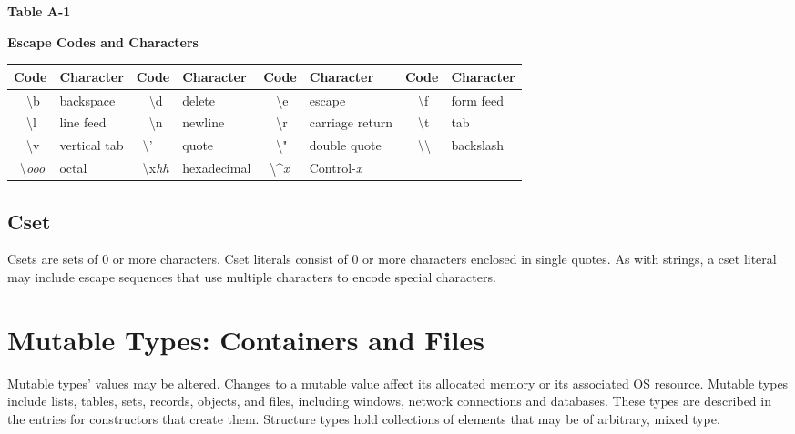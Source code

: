 \begin{center}
{\sffamily\bfseries Table A-1}

{\sffamily\bfseries Escape Codes and Characters}
\end{center}

\begin{center}
\begin{supertabular}{|m{0.38in}|m{0.8in}|m{0.4in}|m{0.855in}|m{0.38in}|m{1.14in}|m{0.38in}|m{0.68in}|}
\hline
{\sffamily\bfseries Code} &
{\sffamily\bfseries Character} &
{\sffamily\bfseries Code} &
{\sffamily\bfseries Character} &
{\sffamily\bfseries Code} &
{\sffamily\bfseries Character} &
{\sffamily\bfseries Code} &
{\sffamily\bfseries Character}\\\hline
\ \ {\textbackslash}b & backspace &
\ \ {\textbackslash}d & delete &
\ \ {\textbackslash}e & escape &
\ \ {\textbackslash}f & form feed\\\hline
\ \ {\textbackslash}l & line feed &
\ \ {\textbackslash}n & newline &
\ \ {\textbackslash}r & carriage return &
\ \ {\textbackslash}t & tab\\\hline
\ \ {\textbackslash}v & vertical tab &
\ {\textbackslash}' & quote &
\ \ {\textbackslash}" & double quote &
\ \ {\textbackslash}{\textbackslash} & backslash\\\hline
\ {\textbackslash}\textit{ooo} & octal &
\ {\textbackslash}x\textit{hh} & hexadecimal  &
\ {\textbackslash}\^{}\textit{x} & Control-\textit{x} &
~
 &
~
\\\hline
\end{supertabular}
\end{center}


\subsection*{Cset}

Csets are sets of 0 or more characters. Cset literals
consist of 0 or more characters enclosed in single quotes. As with
strings, a cset literal may include escape
sequences that use multiple characters to encode special characters.

\section{Mutable Types: Containers and Files}

Mutable types' values may be altered. Changes to a
mutable value affect its allocated memory or its
associated OS resource. Mutable types include lists, tables,
sets, records, objects, and files, including windows, network
connections and databases. These types are described in
the entries for constructors that
create them. Structure types hold
collections of elements that may be of arbitrary, mixed type.

